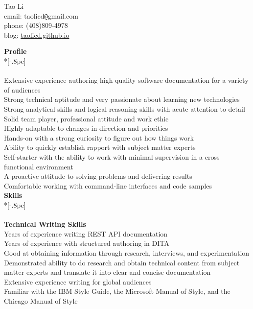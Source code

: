 \documentclass[11pt]{extarticle}
\begin{document}
\begin{center}
{\Large Tao Li} \\[0.2pc]
email: taolicd\verb|@|gmail.com \\
phone: (408)809-4978     \\
blog: \url{taolicd.github.io} \\ 

\end{center}

{\large \bf Profile} \\*[-.8pc]
\underline{\hspace{6.55in}} \\
\\
Extensive experience authoring high quality software documentation for a variety of audiences  \\
Strong technical aptitude and very passionate about learning new technologies\\
Strong analytical skills and logical reasoning skills with acute attention to detail\\
Solid team player, professional attitude and work ethic\\
Highly adaptable to changes in direction and priorities\\
Hands-on with a strong curiosity  to figure out how things work\\
Ability to quickly establish rapport with subject matter experts\\
Self-starter with the ability to work with minimal supervision in a cross functional environment\\
A proactive attitude to solving problems and delivering results\\
Comfortable working with command-line interfaces and code samples\\



{\large \bf Skills} \\*[-.8pc]
\underline{\hspace{6.55in}} \\
\\
{\bf Technical Writing Skills} \\
Years of experience writing REST API documentation \\
Years of experience with structured authoring in DITA\\
Good at obtaining information through research, interviews, and experimentation\\
Demonstrated ability to do research and obtain technical content from subject matter experts and translate it into clear and concise documentation\\
Extensive experience writing for global audiences\\
Familiar with the IBM Style Guide, the Microsoft Manual of Style, and the Chicago Manual of Style\\
\end{document}
